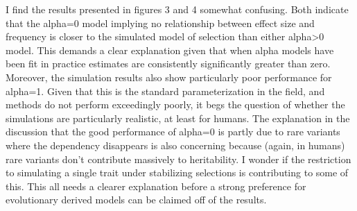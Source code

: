 
\newpage


\begin{point}{} %
I find the results presented in figures 3 and 4 somewhat confusing. Both indicate that the alpha=0 model implying no relationship between effect size and frequency is closer to the simulated model of selection than either alpha>0 model. This demands a clear explanation given that when alpha models have been fit in practice estimates are consistently significantly greater than zero. Moreover, the simulation results also show particularly poor performance for alpha=1. Given that this is the standard parameterization in the field, and methods do not perform exceedingly poorly, it begs the question of whether the simulations are particularly realistic, at least for humans. The explanation in the discussion that the good performance of alpha=0 is partly due to rare variants where the dependency disappears is also concerning because (again, in humans) rare variants don't contribute massively to heritability. I wonder if the restriction to simulating a single trait under stabilizing selections is contributing to some of this. This all needs a clearer explanation before a strong preference for evolutionary derived models can be claimed off of the results.
\end{point}


